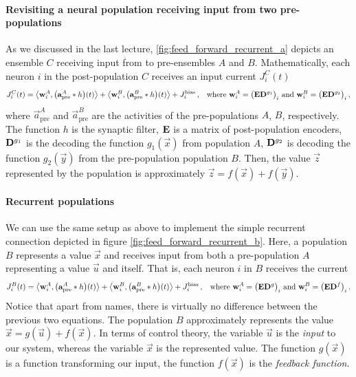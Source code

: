 \documentclass[10pt,letterpaper,oneside]{article}
\begin{document}

\paragraph{Revisiting a neural population receiving input from two pre-populations}
As we discussed in the last lecture, \cref{fig:feed_forward_recurrent_a} depicts an ensemble $C$ receiving input from to pre-ensembles $A$ and $B$. Mathematically, each neuron $i$ in the post-population $C$ receives an input current $J^C_i(t)$
\begin{align*}
	J^C_i(t) &= \big\langle {\mathbf{w}}_i^A , \big ( {\mathbf{a}}^{A}_\mathrm{pre} \ast h \big)(t) \big\rangle
	        + \big\langle {\mathbf{w}}_i^B , \big ( {\mathbf{a}}^{B}_\mathrm{pre} \ast h \big)(t) \big\rangle
	        + J^\mathrm{bias}_i \,,
	       & \text{where } {\mathbf{w}}^A_i = \big( {\mathbf{E}} {\mathbf{D}}^{g_1} \big)_i \text{ and } {\mathbf{w}}^B_i = \big( {\mathbf{E}} {\mathbf{D}}^{g_2} \big)_i \,,
\end{align*}
where $\vec a^{A}_\mathrm{pre}$ and $\vec a^{B}_\mathrm{pre}$ are the activities of the pre-populations $A$, $B$, respectively. The function $h$ is the synaptic filter, ${\mathbf{E}}$ is a matrix of post-population encoders, ${\mathbf{D}}^{g_1}$ is the decoding the function $g_1(\vec x)$ from population $A$, ${\mathbf{D}}^{g_2}$ is decoding the function ${g_2}(\vec y)$ from the pre-population population $B$. Then, the value $\vec z$ represented by the population is approximately $\vec z = f(\vec x) + f(\vec y)$.

\paragraph{Recurrent populations}
We can use the same setup as above to implement the simple recurrent connection depicted in figure \cref{fig:feed_forward_recurrent_b}. Here, a population $B$ represents a value $\vec x$ and receives input from both a pre-population $A$ representing a value $\vec u$ and itself. That is, each neuron $i$ in $B$ receives the current
\begin{align*}
	J^B_i(t) &= \big\langle {\mathbf{w}}_i^A , \big ( {\mathbf{a}}^{A}_\mathrm{pre} \ast h \big)(t) \big\rangle
			+ \big\langle {\mathbf{w}}_i^B , \big ( {\mathbf{a}}^{B}_\mathrm{pre} \ast h \big)(t) \big\rangle
			+ J^\mathrm{bias}_i \,,
			& \text{where } {\mathbf{w}}^A_i = \big( {\mathbf{E}} {\mathbf{D}}^{g} \big)_i \text{ and } {\mathbf{w}}^B_i = \big( {\mathbf{E}} {\mathbf{D}}^{f} \big)_i \,.
\end{align*}
Notice that apart from names, there is virtually no difference between the previous two equations. The population $B$ approximately represents the value $\vec x = g(\vec u) + f(\vec x)$. In terms of control theory, the variable $\vec u$ is the \emph{input} to our system, whereas the variable $\vec x$ is the represented value. The function $g(\vec x)$ is a function transforming our input, the function $f(\vec x)$ is the \emph{feedback function}.
\end{document}
